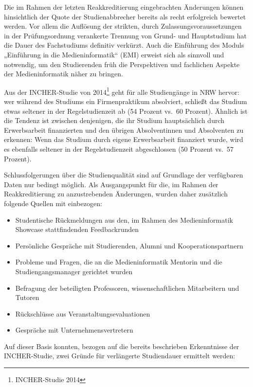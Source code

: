 Die im Rahmen der letzten Reakkreditierung eingebrachten Änderungen
können hinsichtlich der Quote der Studienabbrecher bereits als recht
erfolgreich bewertet werden. Vor allem die Auflösung der strikten, durch
Zulassungsvoraussetzungen in der Prüfungsordnung verankerte Trennung von
Grund- und Hauptstudium hat die Dauer des Fachstudiums definitiv
verkürzt. Auch die Einführung des Moduls „Einführung in die
Medieninformatik`` (EMI) erweist sich als sinnvoll und notwendig, um den
Studierenden früh die Perspektiven und fachlichen Aspekte der
Medieninformatik näher zu bringen.

Aus der INCHER-Studie von 2014\footnote{INCHER-Studie 2014} geht für
alle Studiengänge in NRW hervor: wer während des Studiums ein
Firmenpraktikum absolviert, schließt das Studium etwas seltener in der
Regelstudienzeit ab (54 Prozent vs.~60 Prozent). Ähnlich ist die Tendenz
ist zwischen denjenigen, die ihr Studium hauptsächlich durch
Erwerbsarbeit finanzierten und den übrigen Absolventinnen und
Absolventen zu erkennen: Wenn das Studium durch eigene Erwerbsarbeit
finanziert wurde, wird es ebenfalls seltener in der Regelstudienzeit
abgeschlossen (50 Prozent vs.~57 Prozent).

Schlussfolgerungen über die Studienqualität sind auf Grundlage der
verfügbaren Daten nur bedingt möglich. Als Ausgangspunkt für die, im
Rahmen der Reakkreditierung zu anzustrebenden Änderungen, wurden daher
zusätzlich folgende Quellen mit einbezogen:

\begin{itemize}
\tightlist
\item
  Studentische Rückmeldungen aus den, im Rahmen des Medieninformatik
  Showcase stattfindenden Feedbackrunden
\item
  Persönliche Gespräche mit Studierenden, Alumni und
  Kooperationspartnern
\item
  Probleme und Fragen, die an die Medieninformatik Mentorin und die
  Studiengangsmanager gerichtet wurden
\item
  Befragung der beteiligten Professoren, wissenschaftlichen Mitarbeitern
  und Tutoren
\item
  Rückschlüsse aus Veranstaltungsevaluationen
\item
  Gespräche mit Unternehmensvertretern
\end{itemize}

Auf dieser Basis konnten, bezogen auf die bereits beschrieben
Erkenntnisse der INCHER-Studie, zwei Gründe für verlängerte Studiendauer
ermittelt werden:

